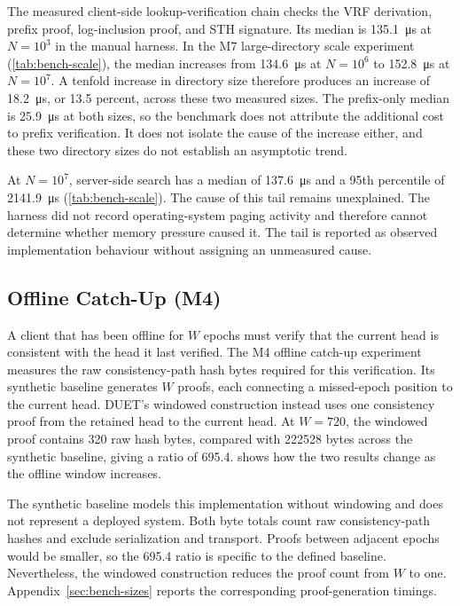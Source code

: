 The measured client-side lookup-verification chain checks the VRF derivation, prefix proof,
log-inclusion proof, and STH signature. Its median is \SI{135.1}{\micro\second} at $N=10^{3}$ in the manual harness. In the M7
large-directory scale experiment (\cref{tab:bench-scale}), the median increases from
\SI{134.6}{\micro\second} at $N=10^{6}$ to \SI{152.8}{\micro\second} at $N=10^{7}$. A tenfold
increase in directory size therefore produces an increase of \SI{18.2}{\micro\second}, or 13.5
percent, across these two measured sizes. The prefix-only median is \SI{25.9}{\micro\second} at
both sizes, so the benchmark does not attribute the additional cost to prefix verification. It
does not isolate the cause of the increase either, and these two directory sizes do not establish
an asymptotic trend.

At $N=10^{7}$, server-side search has a median of \SI{137.6}{\micro\second} and a 95th percentile of
\SI{2141.9}{\micro\second} (\cref{tab:bench-scale}). The cause of this tail remains unexplained. The
harness did not record operating-system paging activity and therefore cannot determine whether
memory pressure caused it. The tail is reported as observed implementation behaviour without
assigning an unmeasured cause.

\subsection{Offline Catch-Up (M4)}\label{ssec:eval-catchup}

A client that has been offline for $W$ epochs must verify that the current head is consistent with
the head it last verified. The M4 offline catch-up experiment measures the raw consistency-path hash
bytes required for this verification. Its synthetic baseline generates $W$ proofs, each connecting
a missed-epoch position to the current head. DUET's windowed construction instead uses one
consistency proof from the retained head to the current head. At $W=720$, the windowed proof
contains \num{320} raw hash bytes, compared with \num{222528} bytes across the synthetic baseline,
giving a ratio of \num{695.4}.  shows how the two results change as the
offline window increases.

The synthetic baseline models this implementation without windowing and does not represent a
deployed system. Both byte totals count raw consistency-path hashes and exclude serialization and
transport. Proofs between adjacent epochs would be smaller, so the \num{695.4} ratio is specific to
the defined baseline. Nevertheless, the windowed construction reduces the proof count from $W$ to
one. Appendix~\ref{sec:bench-sizes} reports the corresponding proof-generation timings.

